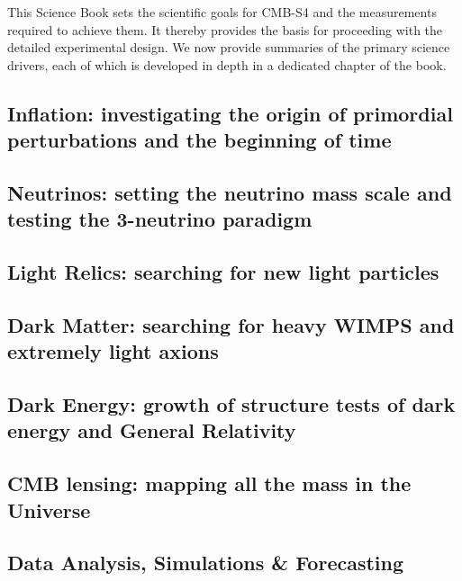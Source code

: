 This Science Book sets the scientific goals for CMB-S4 and the measurements required to achieve them. It thereby provides the basis for proceeding with the detailed experimental design. We now provide summaries of the primary science drivers, each of which is developed in depth in a dedicated chapter of the book.

\subsection*{Inflation: investigating the origin of primordial perturbations and the beginning of time}



\subsection*{Neutrinos: setting the neutrino mass scale and testing the 3-neutrino paradigm}



\subsection*{Light Relics: searching for new light particles}


 
\subsection*{Dark Matter: searching for heavy WIMPS and extremely light axions}



\subsection*{Dark Energy: growth of structure tests of dark energy and General Relativity}



\subsection*{CMB lensing: mapping all the mass in the Universe}



\subsection*{Data Analysis, Simulations \& Forecasting}



\eject






 
